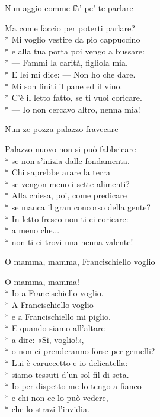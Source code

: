 \documentclass[11pt]{book}
\begin{document}
\begin{poem}{Nun aggio comme fà’ pe’ te parlare}{}
\settowidth{\versewidth}{C’è il letto fatto, se ti vuoi coricare}
\begin{altverse}
Ma come faccio per poterti parlare?\\*
Mi voglio vestire da pio cappuccino\\*
e alla tua porta poi vengo a bussare:\\*
— Fammi la carità, figliola mia.\\*
E lei mi dice: — Non ho che dare.\\*
Mi son finiti il pane ed il vino.\\*
C’è il letto fatto, se ti vuoi coricare.\\*
— Io non cercavo altro, nenna mia!
\end{altverse}
\end{poem}

\begin{poem}{Nun ze pozza palazzo fravecare}{}
\settowidth{\versewidth}{Se manca il gran concorso della gente}
\begin{altverse}
Palazzo nuovo non si può fabbricare\\*
se non s’inizia dalle fondamenta.\\*
Chi saprebbe arare la terra\\*
se vengon meno i sette alimenti?\\*
Alla chiesa, poi, come predicare\\*
se manca il gran concorso della gente?\\*
In letto fresco non ti ci coricare:\\*
a meno che...\\*
non ti ci trovi una nenna valente!
\end{altverse}
\end{poem}

\begin{poem}{O mamma, mamma, Francischiello voglio}{}
\settowidth{\versewidth}{O non ci prenderanno forse per gemelli}
\begin{altverse}
O mamma, mamma!\\*
Io a Francischiello voglio.\\*
A Francischiello voglio\\*
e a Francischiello mi piglio.\\*
E quando siamo all’altare\\*
a dire: «Sì, voglio!»,\\*
o non ci prenderanno forse per gemelli?\\*
Lui è caruccetto e io delicatella:\\*
siamo tessuti d'un sol fil di seta.\\*
Io per dispetto me lo tengo a fianco\\*
e chi non ce lo può vedere,\\*
che lo strazi l’invidia.
\end{altverse}
\end{poem}
\end{document}
